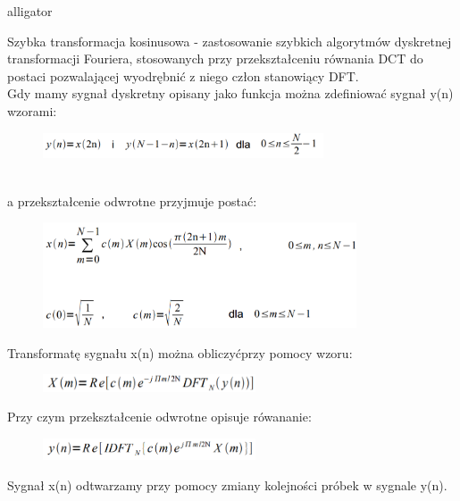 \documentclass[12pt]{article}
\begin{document}
\begin{labeling}{alligator}
\item [Szybka transformacja kosinusowa] - zastosowanie szybkich algorytmów dyskretnej transformacji Fouriera, stosowanych przy przekształceniu
równania DCT do postaci pozwalającej wyodrębnić z niego człon stanowiący DFT. 
\\ Gdy mamy sygnał dyskretny opisany jako funkcja można zdefiniować
sygnał y(n) wzorami:
\begin{figure}[h!]
 \centering
 \includegraphics[width=8.3cm]{yn.PNG}
 \vspace{-0.3cm}
 \label{kr}
\end{figure}
\\ a przekształcenie odwrotne przyjmuje postać: 
\newpage
\begin{figure}[h!]
 \centering
 \includegraphics[width=9.3cm]{DCT2O.PNG}
 \vspace{-0.3cm}
 \label{kw}
\end{figure}

Transformatę sygnału x(n) można obliczyćprzy pomocy wzoru:
\begin{figure}[h!]
 \centering
 \includegraphics[width=6.3cm]{xmF.PNG}
 \vspace{-0.3cm}
 \label{kw}
\end{figure}
Przy czym przekształcenie odwrotne opisuje rówananie:
\begin{figure}[h!]
 \centering
 \includegraphics[width=6.3cm]{xmFO.PNG}
 \vspace{-0.3cm}
 \label{kw}
\end{figure}

Sygnał x(n) odtwarzamy przy pomocy zmiany kolejności próbek w sygnale y(n).

\end{labeling}

\end{document}
